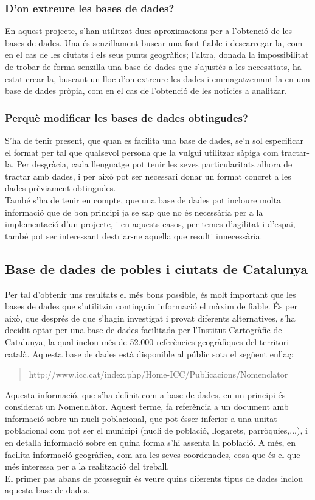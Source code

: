 \documentclass[12pt,a4paper,openright,oneside]{article}
\numberwithin{equation}{section}
\theoremstyle{definition}
\begin{document}
\subsubsection*{D'on extreure les bases de dades?}
En aquest projecte, s'han utilitzat dues aproximacions per a l'obtenció de les bases de dades. Una és senzillament buscar una font fiable i descarregar-la, com en el cas de les ciutats i els seus punts geogràfics; l'altra, donada la impossibilitat de trobar de forma senzilla una base de dades que s'ajustés a les necessitats, ha estat crear-la, buscant un lloc d'on extreure les dades i emmagatzemant-la en una base de dades pròpia, com en el cas de l'obtenció de les notícies a analitzar.
\subsubsection*{Perquè modificar les bases de dades obtingudes?}
S'ha de tenir present, que quan es facilita una base de dades, se'n sol especificar el format per tal que qualsevol persona que la vulgui utilitzar sàpiga com tractar-la. Per desgràcia, cada llenguatge pot tenir les seves particularitats alhora de tractar amb dades, i per això pot ser necessari donar un format concret a les dades prèviament obtingudes. \\També s'ha de tenir en compte, que una base de dades pot incloure molta informació que de bon principi ja se sap que no és necessària per a la implementació d'un projecte, i en aquests casos, per temes d'agilitat i d'espai, també pot ser interessant destriar-ne aquella que resulti innecessària.


\newpage
\subsection*{Base de dades de pobles i ciutats de Catalunya}
Per tal d'obtenir uns resultats el més bons possible, és molt important que les bases de dades que s'utilitzin continguin informació el màxim de fiable. És per això, que després de que s'hagin investigat i provat diferents alternatives, s'ha decidit optar per una base de dades facilitada per l'Institut Cartogràfic de Catalunya, la qual inclou més de 52.000 referències geogràfiques del territori català. Aquesta base de dades està disponible al públic sota el següent enllaç:
\begin{quote}
http://www.icc.cat/index.php/Home-ICC/Publicacions/Nomenclator
\end{quote}
Aquesta informació, que s'ha definit com a base de dades, en un principi és considerat un Nomenclàtor. Aquest terme, fa referència a un document amb informació sobre un nucli poblacional, que pot ésser inferior a una unitat poblacional com pot ser el municipi (nucli de població, llogarets, parròquies,...), i en detalla informació sobre en quina forma s'hi assenta la població. A més, en facilita informació geogràfica, com ara les seves coordenades, cosa que és el que més interessa per a la realització del treball.\\
El primer pas abans de prosseguir és veure quins diferents tipus de dades inclou aquesta base de dades.
\end{document}

